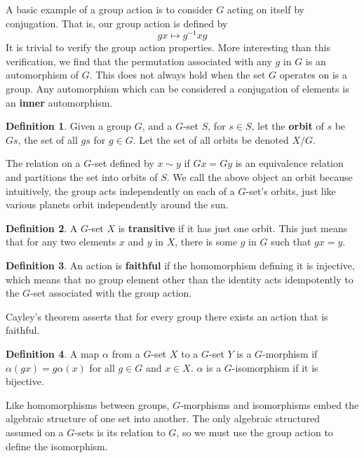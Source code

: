 \documentclass[12pt]{amsbook}
\theoremstyle{definition}
\newtheorem{definition}{Definition}
\begin{document}
A basic example of a group action is to consider $G$ acting on itself by conjugation. That is, our group action is defined by
%
\[ gx \mapsto g^{-1}xg \]
%
It is trivial to verify the group action properties. More interesting than this verification, we find that the permutation associated with any $g$ in $G$ is an automorphism of $G$. This does not always hold when the set $G$ operates on is a group. Any automorphism which can be considered a conjugation of elements is an {\bf inner} automorphism.

\begin{definition}
Given a group $G$, and a $G$-set $S$, for $s \in S$, let the {\bf orbit}  of $s$ be $Gs$, the set of all $gs$ for $g \in G$. Let the set of all orbits be denoted $X/G$.
\end{definition}

The relation on a $G$-set defined by $x \sim y$ if $Gx = Gy$ is an equivalence relation and partitions the set into orbits of $S$. We call the above object an orbit because intuitively, the group acts independently on each of a $G$-set's orbits, just like various planets orbit independently around the sun.

\begin{definition}
    A $G$-set $X$ is {\bf transitive}  if it has just one orbit. This just means that for any two elements $x$ and $y$ in $X$, there is some $g$ in $G$ such that $gx = y$.
\end{definition}

\begin{definition}
    An action is {\bf faithful}  if the homomorphism defining it is injective, which means that no group element other than the identity acts idempotently to the $G$-set associated with the group action.
\end{definition}

Cayley's theorem asserts that for every group there exists an action that is faithful.

\begin{definition}
    A map $\alpha$ from a  $G$-set $X$ to a $G$-set $Y$ is a $G$-morphism  if $\alpha(gx) = g\alpha(x)$ for all $g \in G$ and $x \in X$. $\alpha$ is a $G$-isomorphism if it is bijective.
\end{definition}

Like homomorphisms between groups, $G$-morphisms and isomorphisms embed the algebraic structure of one set into another. The only algebraic structured assumed on a $G$-sets is its relation to $G$, so we must use the group action to define the isomorphism.
\end{document}
